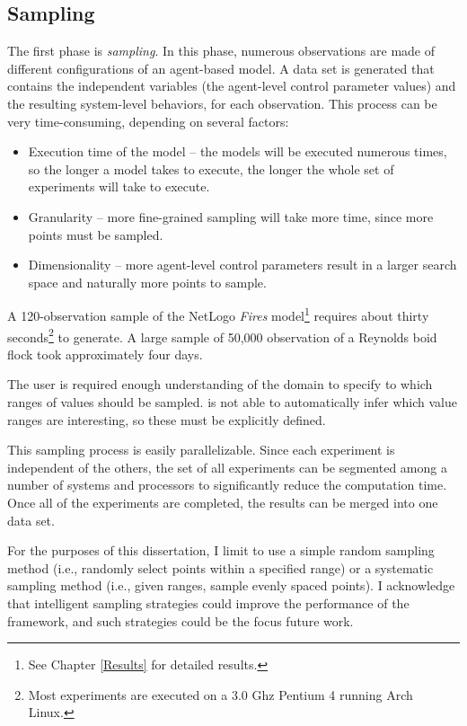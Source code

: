 \subsection{Sampling}
The first phase is \textit{sampling}.
In this phase, numerous observations are made of different configurations of an agent-based model.
A data set is generated that contains the independent variables (the agent-level control parameter values) and the resulting system-level behaviors, for each observation.
This process can be very time-consuming, depending on several factors:
\begin{itemize}
  \item Execution time of the model -- the models will be executed numerous times, so the longer a model takes to execute, the longer the whole set of experiments will take to execute.
  \item Granularity -- more fine-grained sampling will take more time, since more points must be sampled.
  \item Dimensionality -- more agent-level control parameters result in a larger search space and naturally more points to sample.
\end{itemize}
A 120-observation sample of the NetLogo \textit{Fires} model\footnote{See Chapter \ref{Results} for detailed results.} \cite{fires} requires about thirty seconds\footnote{Most experiments are executed on a 3.0 Ghz Pentium 4 running Arch Linux.} to generate.
A large sample of 50,000 observation of a Reynolds boid flock \cite{reynolds1987} took approximately four days.

The user is required enough understanding of the domain to specify to \fw which  ranges of values should be sampled.
\fw is not able to automatically infer which value ranges are interesting, so these must be explicitly defined.

This sampling process is easily parallelizable.
Since each experiment is independent of the others, the set of all experiments can be segmented among a number of systems and processors to significantly reduce the computation time.
Once all of the experiments are completed, the results can be merged into one data set.

For the purposes of this dissertation, I limit \fw to use a simple random sampling method (i.e., randomly select points within a specified range) or a systematic sampling method (i.e., given ranges, sample evenly spaced points).
I acknowledge that intelligent sampling strategies could improve the performance of the framework, and such strategies could be the focus future work.


